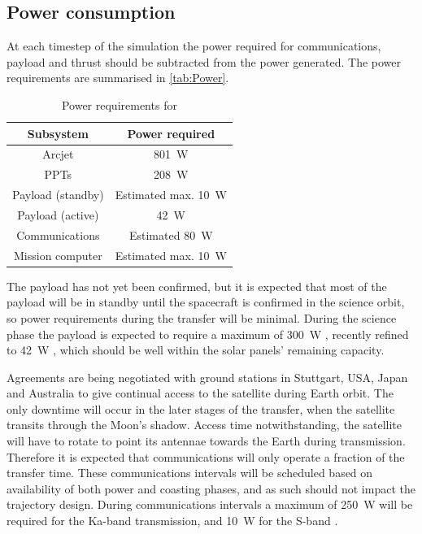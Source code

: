 
\subsection{Power consumption} \label{sub:Power-consumption}

At each timestep of the simulation the power required for communications, payload and thrust should be subtracted from the power generated. The power requirements are summarised in \autoref{tab:Power}.

\begin{table}[b]
\centering
\caption{Power requirements for \BW} \label{tab:Power}
\begin{tabular}{cc} \toprule
Subsystem & Power required \tabularnewline\midrule 
Arcjet &  801~W \tabularnewline
PPTs &  208~W \tabularnewline
Payload (standby) & Estimated max. 10~W \tabularnewline
Payload (active) & 42~W \tabularnewline
Communications & Estimated 80~W \tabularnewline
Mission computer & Estimated max. 10~W \tabularnewline
\bottomrule
\end{tabular}
\end{table}

The payload has not yet been confirmed, but it is expected that most of the payload will be in standby until the spacecraft is confirmed in the science orbit, so power requirements during the transfer will be minimal. During the science phase the payload is expected to require a maximum of 300~W \parencite{web_BW-1}, recently refined to 42~W \parencite{Laufer_thesis}, which should be well within the solar panels' remaining capacity.

Agreements are being negotiated with ground stations in Stuttgart, USA, Japan and Australia to give continual access to the satellite during Earth orbit. The only downtime will occur in the later stages of the transfer, when the satellite transits through the Moon's shadow. Access time notwithstanding, the satellite will have to rotate to point its antennae towards the Earth during transmission. Therefore it is expected that communications will only operate a fraction of the transfer time. These communications intervals will be scheduled based on availability of both power and coasting phases, and as such should not impact the trajectory design. During communications intervals a maximum of 250~W will be required for the Ka-band transmission, and 10~W for the S-band \parencite[recently revised to 60~W for Ka-band and 20~W for S-band, ][]{Laufer_thesis}.

